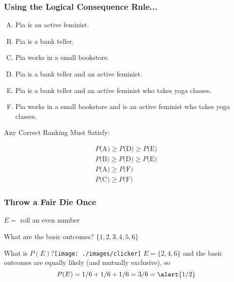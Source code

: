 \begin{frame}
\frametitle{Using the Logical Consequence Rule...}
 \footnotesize
		\begin{enumerate}[(A)]
			\item Pia is an active feminist.
			\item Pia is a bank teller.
			\item Pia works in a small bookstore.
			\item Pia is a bank teller and an active feminist.
			\item Pia is a bank teller and an active feminist who takes yoga classes.
			\item Pia works in a small bookstore and is an active feminist who takes yoga classes.
		\end{enumerate}
\begin{alertblock}{Any Correct Ranking Must Satisfy:}\end{alertblock}
\begin{eqnarray*}
P\mbox{(A)}\geq P\mbox{(D)}\geq P\mbox{(E)}\\
P\mbox{(B)}\geq P\mbox{(D)}\geq P\mbox{(E)}\\
P\mbox{(A)}\geq P\mbox{(F)}\\
P\mbox{(C)}\geq P\mbox{(F)}
\end{eqnarray*}
\end{frame}
\begin{frame}
\frametitle{Throw a Fair Die Once}
\begin{block}{$E = $ roll an even number}
\end{block}
\begin{block}{What are the basic outcomes?}
$\{1,2,3,4,5,6\}$
\end{block}\pause
\begin{block}{What is $P(E)$?\hfill \texttt{[image: ./images/clicker]} }\pause
$E = \{2,4,6\}$ and the basic outcomes are equally likely (and mutually exclusive), so 
	$$P(E) = 1/6 + 1/6 + 1/6 = 3/6 = \alert{1/2}$$
\end{block}

\end{frame}
